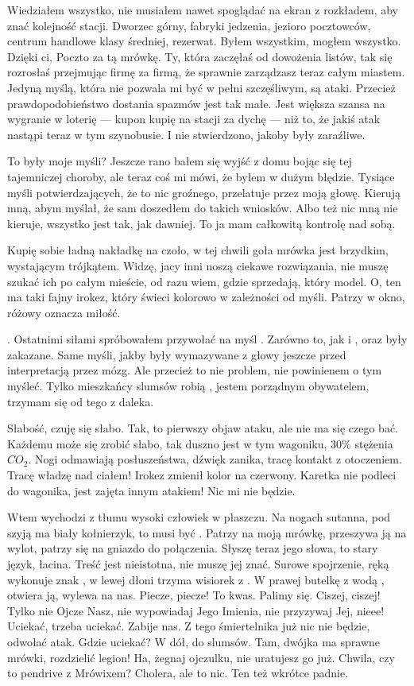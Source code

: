 Wiedziałem wszystko, nie musiałem nawet spoglądać na ekran z rozkładem, aby znać kolejność stacji.
Dworzec górny, fabryki jedzenia, jezioro pocztowców, centrum handlowe klasy średniej, rezerwat.
Byłem wszystkim, mogłem wszystko. 
Dzięki ci, Poczto za tą mrówkę. Ty, która zaczęłaś od dowożenia listów, tak się rozrosłaś przejmując firmę za firmą, że sprawnie zarządzasz teraz całym miastem.
Jedyną myślą, która nie pozwala mi być w pełni szczęśliwym, są ataki. Przecież prawdopodobieństwo dostania spazmów jest tak małe.
Jest większa szansa na wygranie w loterię --- kupon kupię na stacji za dychę --- niż to, że jakiś atak nastąpi teraz w tym szynobusie.
I nie stwierdzono, jakoby były zaraźliwe.

To były moje myśli? Jeszcze rano bałem się wyjść z domu bojąc się tej tajemniczej choroby, ale teraz coś mi mówi, że byłem w dużym błędzie.
Tysiące myśli potwierdzających, że to nic groźnego, przelatuje przez moją głowę.
Kierują mną, abym myślał, że sam doszedłem do takich wniosków.
Albo też nic mną nie kieruje, wszystko jest tak, jak dawniej. To ja mam całkowitą kontrolę nad sobą.

Kupię sobie ładną nakładkę na czoło, w tej chwili goła mrówka jest brzydkim, wystającym trójkątem.
Widzę, jacy inni noszą ciekawe rozwiązania, nie muszę szukać ich po całym mieście, od razu wiem, gdzie sprzedają, który model.
O, ten ma taki fajny irokez, który świeci kolorowo w zależności od myśli. Patrzy w okno, różowy oznacza miłość.

\censor{}. Ostatnimi siłami spróbowałem przywołać na myśl \censor{}. 
Zarówno to, jak i \censor{}, oraz \censor{} były zakazane.
Same myśli, jakby były wymazywane z głowy jeszcze przed interpretacją przez mózg.
Ale przecież to nie problem, nie powinienem o tym myśleć. 
Tylko mieszkańcy slumsów robią \censor{}, jestem porządnym obywatelem, trzymam się od tego z daleka.

Słabość, czuję się słabo.
Tak, to pierwszy objaw ataku, ale nie ma się czego bać.
Każdemu może się zrobić słabo, tak duszno jest w tym wagoniku, 30\% stężenia $CO_2$.
Nogi odmawiają posłuszeństwa, dźwięk zanika, tracę kontakt z otoczeniem.
Tracę władzę nad ciałem! Irokez zmienił kolor na czerwony.
Karetka nie podleci do wagonika, jest zajęta innym atakiem!
Nic mi nie będzie.

Wtem wychodzi z tłumu wysoki człowiek w płaszczu.
Na nogach sutanna, pod szyją ma biały kołnierzyk, to musi być \censor{}.
Patrzy na moją mrówkę, przeszywa ją na wylot, patrzy się na gniazdo do połączenia.
Słyszę teraz jego słowa, to stary język, łacina. Treść jest nieistotna, nie muszę jej znać.
Surowe spojrzenie, ręką wykonuje znak \censor{}, w lewej dłoni trzyma wisiorek z \censor{}.
W prawej butelkę z wodą \censor{}, otwiera ją, wylewa na nas.
Piecze, piecze! To kwas. Palimy się. 
Ciszej, ciszej! Tylko nie Ojcze Nasz, nie wypowiadaj Jego Imienia, nie przyzywaj Jej, nieee!
Uciekać, trzeba uciekać. Zabije nas. Z tego śmiertelnika już nic nie będzie, odwołać atak.
Gdzie uciekać? W dół, do slumsów. Tam, dwójka ma sprawne mrówki, rozdzielić legion!
Ha, żegnaj ojczulku, nie uratujesz go już. Chwila, czy to pendrive z Mrówixem? Cholera, ale to nic. Ten też wkrótce padnie.

